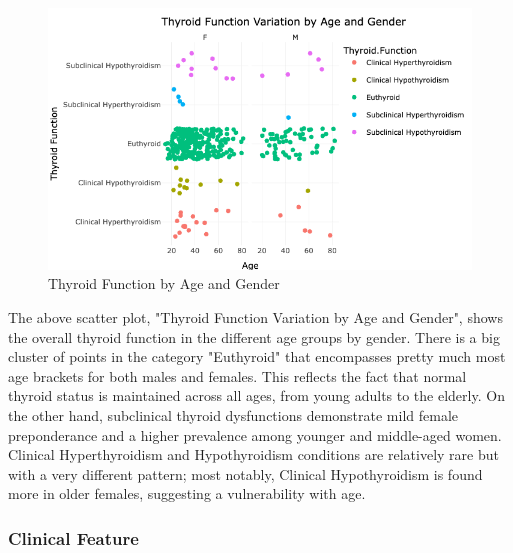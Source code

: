 \documentclass[12pt]{article}
\begin{document}
\begin{enumerate}
 \begin{figure}[h]
        \vspace{5pt}
        \centering
        \includegraphics[width=1.15\textwidth]{thyroid vs age vs gender.png}  
        \caption{Thyroid Function by Age and Gender}
            \label{fig:example}
       \vspace{0.5cm}
    \end{figure}

The above scatter plot, "Thyroid Function Variation by Age and Gender", shows the overall thyroid function in the different age groups by gender. There is a big cluster of points in the category "Euthyroid" that encompasses pretty much most age brackets for both males and females. This reflects the fact that normal thyroid status is maintained across all ages, from young adults to the elderly. On the other hand, subclinical thyroid dysfunctions demonstrate mild female preponderance and a higher prevalence among younger and middle-aged women. Clinical Hyperthyroidism and Hypothyroidism conditions are relatively rare but with a very different pattern; most notably, Clinical Hypothyroidism is found more in older females, suggesting a vulnerability with age.

\newpage





\end{enumerate}

\subsubsection{Clinical Feature}
\end{document}

